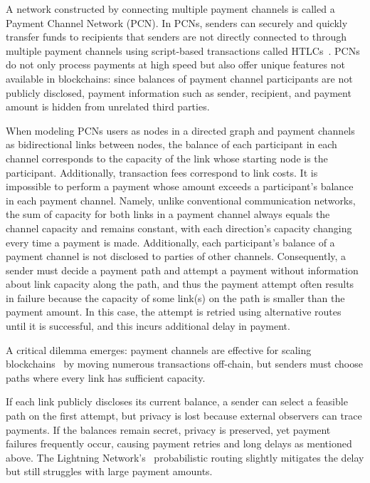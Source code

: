 \documentclass[a4paper]{IEEEtran}
\begin{document}
A network constructed by connecting multiple payment channels is called a Payment Channel Network (PCN).
In PCNs, senders can securely and quickly transfer funds to recipients that senders are not directly connected to through multiple payment channels using script-based transactions called HTLCs~\cite{poon_dryja_2016}.
PCNs do not only process payments at high speed but also offer unique features not available in blockchains: since balances of payment channel participants are not publicly disclosed, payment information such as sender, recipient, and payment amount is hidden from unrelated third parties.

When modeling PCNs users as nodes in a directed graph and payment channels as bidirectional links between nodes, the balance of each participant in each channel corresponds to the capacity of the link whose starting node is the participant.
Additionally, transaction fees correspond to link costs.
It is impossible to perform a payment whose amount exceeds a participant's balance in each payment channel.
Namely, unlike conventional communication networks, the sum of capacity for both links in a payment channel always equals the channel capacity and remains constant, with each direction's capacity changing every time a payment is made.
Additionally, each participant's balance of a payment channel is not disclosed to parties of other channels.
Consequently, a sender must decide a payment path and attempt a payment without information about link capacity along the path, and thus the payment attempt often results in failure because the capacity of some link(s) on the path is smaller than the payment amount. In this case, the attempt is retried using alternative routes until it is successful, and this incurs additional delay in payment.

A critical dilemma emerges: payment channels are effective for scaling blockchains~\cite{poon_dryja_2016} by moving numerous transactions off-chain, but senders must choose paths where every link has sufficient capacity.

If each link publicly discloses its current balance, a sender can select a feasible path on the first attempt, but privacy is lost because external observers can trace payments.
If the balances remain secret, privacy is preserved, yet payment failures frequently occur, causing payment retries and long delays as mentioned above.
The Lightning Network's~\cite{lnbolt} probabilistic routing slightly mitigates the delay but still struggles with large payment amounts.
\end{document}
